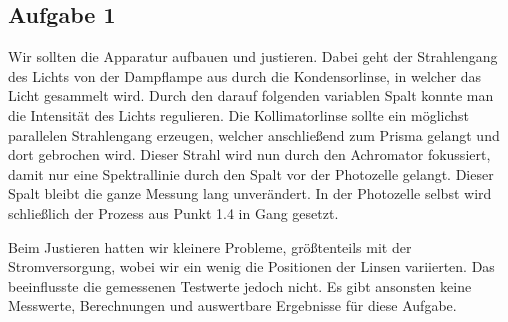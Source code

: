 \subsection{Aufgabe 1}

Wir sollten die Apparatur aufbauen und justieren. Dabei geht der Strahlengang  des Lichts von der Dampflampe aus durch die Kondensorlinse, in welcher das Licht gesammelt wird. Durch den darauf folgenden variablen Spalt konnte man die Intensität des Lichts regulieren. Die Kollimatorlinse sollte ein möglichst parallelen Strahlengang erzeugen, welcher anschließend zum Prisma gelangt und dort gebrochen wird. Dieser Strahl wird nun durch den Achromator fokussiert, damit nur eine Spektrallinie durch den Spalt vor der Photozelle gelangt. Dieser Spalt bleibt die ganze Messung lang unverändert. In der Photozelle selbst wird schließlich der Prozess aus Punkt 1.4 in Gang gesetzt.
\\
\begin{center}
\begin{minipage}{\linewidth}
\centering
{}
%
\label{ringe}
\end{minipage}
\end{center}

Beim Justieren hatten wir kleinere Probleme, größtenteils mit der Stromversorgung, wobei wir ein wenig die Positionen der Linsen variierten. Das beeinflusste die gemessenen Testwerte jedoch nicht. Es gibt ansonsten keine Messwerte, Berechnungen und auswertbare Ergebnisse für diese Aufgabe.
\newpage